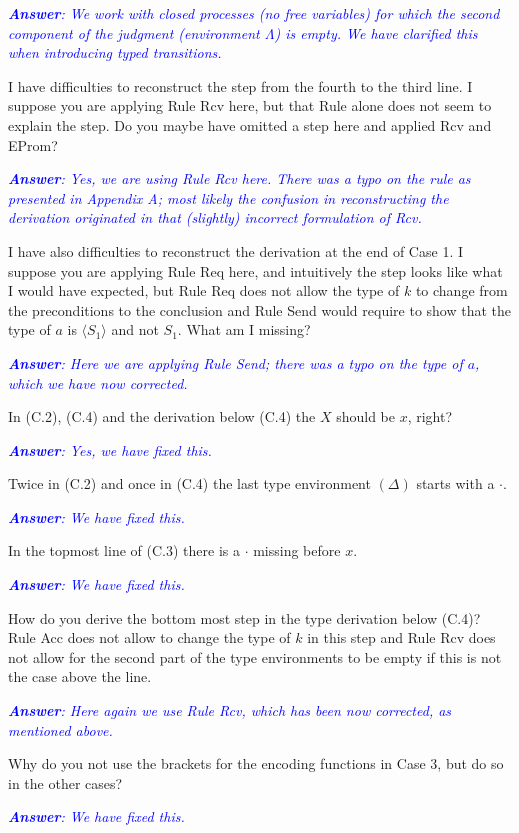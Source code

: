 \documentclass[11pt,a4paper]{article}
\newcommand{\answ}[1]{\smallskip \emph{\textcolor{blue}{\textbf{Answer}:  #1}}}
\begin{document}
\begin{enumerate}
  \answ{We work with closed processes (no free variables) for which the second component of the judgment 
  (environment $\Lambda$) is empty. We have clarified this when introducing typed transitions.}
  
   I have difficulties to reconstruct the step from the fourth to the third line.
  I suppose you are applying Rule Rcv here, but that Rule alone does not seem to
  explain the step. Do you maybe have omitted a step here and applied Rcv and
  EProm?
  
  \answ{Yes, we are using Rule Rcv here. There was a typo on the rule as presented in Appendix A; most likely the confusion in reconstructing the derivation originated in that (slightly) incorrect formulation of Rcv.}
  
   I have also difficulties to reconstruct the derivation at the end of Case 1. I
  suppose you are applying Rule Req here, and intuitively the step looks like
  what I would have expected, but Rule Req does not allow the type of $k$ to
  change from the preconditions to the conclusion and Rule Send would require to
  show that the type of $a$ is $\langle S_1\rangle$ and not $S_1$. What am I missing?
  
  \answ{Here we are applying Rule Send; there was a typo on the type of $a$, which we have now corrected.}
  
    In (C.2), (C.4) and the derivation below (C.4) the $X$ should be $x$, right?
  
  \answ{Yes, we have fixed this.}
  
    Twice in (C.2) and once in (C.4) the last type environment $(\Delta)$ starts
  with a $\cdot$.
  
  \answ{We have fixed this.}
  
    In the topmost line of (C.3) there is a $\cdot$ missing before $x$.
  
   \answ{We have fixed this.}
   
    How do you derive the bottom most step in the type derivation below (C.4)?
  Rule Acc does not allow to change the type of $k$ in this step and Rule Rcv does
  not allow for the second part of the type environments to be empty if this is
  not the case above the line.
  
  \answ{Here again we use Rule Rcv, which has been now corrected, as mentioned above.}
  
  Why do you not use the brackets for the encoding functions in Case 3, but do
  so in the other cases?
  
  \answ{We have fixed this.}
  

\end{enumerate}
\end{document}

